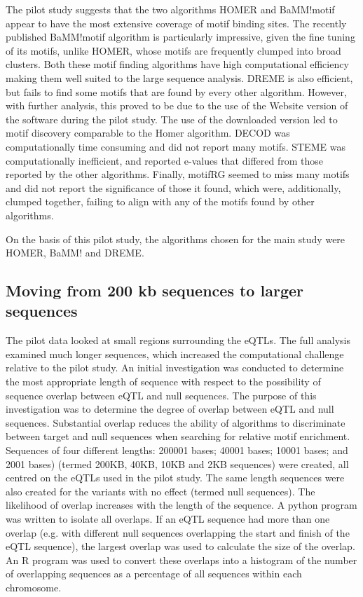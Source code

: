 \documentclass[12pt]{article}
\begin{document}
The pilot study suggests that the two algorithms HOMER and BaMM!motif appear to have the most extensive coverage of motif binding sites. The recently published BaMM!motif algorithm is particularly impressive, given the fine tuning of its motifs, unlike HOMER, whose motifs are frequently clumped into broad clusters. Both these motif finding algorithms have high computational efficiency making them well suited to the large sequence analysis. DREME is also 
efficient, but fails to find some motifs that are found by every other algorithm. However, with further analysis, this proved to be due to the use of the Website version of the software during the pilot study. The use of the downloaded version led to motif discovery comparable to the Homer algorithm. DECOD was computationally time consuming and did not report many motifs. STEME was computationally inefficient, and reported e-values that differed from those reported by the other algorithms. Finally, motifRG seemed to miss many motifs and did not report the significance of those it found, which were, additionally, clumped together, failing to align with any of the motifs found by other algorithms. 

On the basis of this pilot study, the algorithms chosen for the main study were HOMER, BaMM! and DREME.


\subsection{Moving from 200 kb sequences to larger sequences}

The pilot data looked at small regions surrounding the eQTLs. The full analysis examined much longer sequences, which increased the computational challenge relative to the pilot study.  An initial investigation was conducted to determine the most appropriate length of sequence with respect to the possibility of sequence overlap between eQTL and null sequences. The purpose of this investigation was to determine the degree of overlap between eQTL and null sequences. Substantial overlap reduces the ability of algorithms to discriminate between target and null sequences when searching for relative motif enrichment. Sequences of four different lengths: 200001 bases; 40001 bases; 10001 bases; and 2001 bases) (termed 200KB, 40KB, 10KB and 2KB sequences) were created, all centred on the eQTLs used in the pilot study. The same length sequences were also created for the variants with no effect (termed null sequences). The likelihood of overlap increases with the length of the sequence. A python program was written to isolate all overlaps. If an eQTL sequence had more than one overlap (e.g. with different null sequences overlapping the start and finish of the eQTL sequence), the largest overlap was used to calculate the size of the overlap. An R program was used to convert these overlaps into a histogram of the number of overlapping sequences as a percentage of all sequences within each chromosome.
\end{document}
